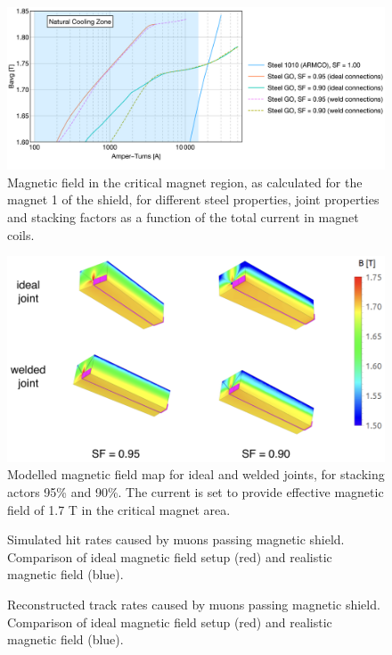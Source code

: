 \documentclass{article}
\begin{document}
\begin{figure}[thbp]
\centering
\includegraphics[width=0.8\columnwidth]{figs/Plot_2_logEx.png}
\caption{Magnetic field in the critical magnet region, as calculated for the magnet 1 of the shield, for different steel properties,
joint properties and stacking factors as a function of the total current in magnet coils. }
\label{fig:shieldEffectiveField}
\end{figure}

\begin{figure}[thbp]
\centering
\includegraphics[width=0.8\columnwidth]{figs/shieldFieldModelling.png}
\caption{Modelled magnetic field map for ideal and welded joints, for stacking actors 95\% and 90\%. The current is set to provide effective magnetic field of 1.7 T in the critical magnet area.}
\label{fig:shieldEffectiveField}
\end{figure}

\begin{figure}[thbp]
\centering
\caption{Simulated hit rates caused by muons passing magnetic shield. Comparison of  ideal magnetic field setup (red) and realistic magnetic field (blue).}
\label{fig:shieldHitsMap}
\end{figure}

\begin{figure}[thbp] 
\centering
\caption{Reconstructed track rates caused by muons passing magnetic shield. Comparison of  ideal magnetic field setup (red) and realistic magnetic field (blue).}
\label{fig:shieldTracks}
\end{figure}







\end{document}
